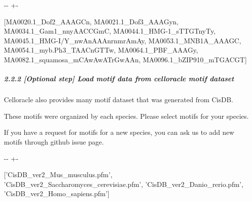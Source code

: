 \documentclass[letterpaper,10pt,english]{sphinxmanual}
\newlength\nbsphinxcodecellspacing
\begin{document}
{

\kern-\sphinxverbatimsmallskipamount\kern-\baselineskip
\kern+\FrameHeightAdjust\kern-\fboxrule
\vspace{\nbsphinxcodecellspacing}

\begin{sphinxVerbatim}[commandchars=\\\{\}]
\llap{\color{nbsphinxout}[10]:\,\hspace{\fboxrule}\hspace{\fboxsep}}[MA0020.1\_Dof2\_AAAGCn,
 MA0021.1\_Dof3\_AAAGyn,
 MA0034.1\_Gam1\_nnyAACCGmC,
 MA0044.1\_HMG-1\_sTTGTnyTy,
 MA0045.1\_HMG-I/Y\_nwAnAAAnrnmrAmAy,
 MA0053.1\_MNB1A\_AAAGC,
 MA0054.1\_myb.Ph3\_TAACnGTTw,
 MA0064.1\_PBF\_AAAGy,
 MA0082.1\_squamosa\_mCAwAwATrGwAAn,
 MA0096.1\_bZIP910\_mTGACGT]
\end{sphinxVerbatim}
}


\subparagraph{2.2.2 {[}Optional step{]} Load motif data from celloracle motif dataset}
\label{\detokenize{notebooks/02_motif_scan/02_atac_peaks_to_TFinfo_with_celloracle_20200801:2.2.2-_Optional-step_-Load-motif-data-from-celloracle-motif-dataset}}
Celloracle also provides many motif dataset that was generated from CisDB. 

These motifs were organized by each species. Please select motifs for your species.

If you have a request for motifs for a new species, you can ask us to add new motifs through github issue page.

{
\begin{sphinxVerbatim}[commandchars=\\\{\}]
\llap{\color{nbsphinxin}[11]:\,\hspace{\fboxrule}\hspace{\fboxsep}}
\end{sphinxVerbatim}
}

{

\kern-\sphinxverbatimsmallskipamount\kern-\baselineskip
\kern+\FrameHeightAdjust\kern-\fboxrule
\vspace{\nbsphinxcodecellspacing}

\begin{sphinxVerbatim}[commandchars=\\\{\}]
\llap{\color{nbsphinxout}[11]:\,\hspace{\fboxrule}\hspace{\fboxsep}}['CisDB\_ver2\_Mus\_musculus.pfm',
 'CisDB\_ver2\_Saccharomyces\_cerevisiae.pfm',
 'CisDB\_ver2\_Danio\_rerio.pfm',
 'CisDB\_ver2\_Homo\_sapiens.pfm']
\end{sphinxVerbatim}
}
\end{document}
